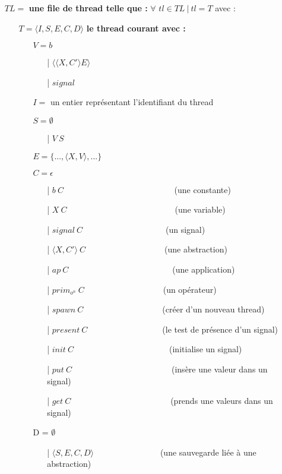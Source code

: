 \documentclass[10pt,a4paper]{report}
\begin{document}
\begin{itemize}
\item[] $TL =$ \textbf{une file de thread telle que :} $\forall$ $tl \in TL~|~tl = T$ avec :
  \begin{itemize}
  \item[] $T = \langle I,S,E,C,D\rangle$ \textbf{le thread courant avec :}
    \begin{itemize}
    \item[] $V = b$	
      \begin{itemize}
      \item[|] $\langle\langle X,C' \rangle E\rangle$
      \item[|] $signal$
      \end{itemize}
    \item[] $I =$ un entier représentant l'identifiant du thread
    \item[] $S =  \emptyset$ 
      \begin{itemize}
      \item[|] $V~S$
      \end{itemize}
    \item[] $E = \{...,\langle X,V\rangle,...\}$
    \item[] $C = \epsilon$
      \begin{itemize}
      \item[|] $b~C$~~~~~~~~~~~~~~~~~~~~~~~~~~    (une constante)
      \item[|] $X~C$~~~~~~~~~~~~~~~~~~~~~~~~~~(une variable)
      \item[|] $signal~C$~~~~~~~~~~~~~~~~~~~~(un signal)
      \item[|] $\langle X,C'\rangle~C$~~~~~~~~~~~~~~~~~~~(une abstraction)
      \item[|] $ap~C$~~~~~~~~~~~~~~~~~~~~~~~~~(une application)
      \item[|] $prim_{o^{n}}~C$~~~~~~~~~~~~~~~~~~~(un opérateur)
      \item[|] $spawn~C$~~~~~~~~~~~~~~~~~~~(créer d'un nouveau thread)
      \item[|] $present~C$~~~~~~~~~~~~~~~~~~(le test de présence d'un signal)
      \item[|] $init~C$~~~~~~~~~~~~~~~~~~~~~~~(initialise un signal)
      \item[|] $put~C$~~~~~~~~~~~~~~~~~~~~~~~~(insère une valeur dans un signal)
      \item[|] $get~C$~~~~~~~~~~~~~~~~~~~~~~~~(prends une valeurs dans un signal)
      \end{itemize}
    \item[] D = $\emptyset$
      \begin{itemize}
      \item[|] $\langle S,E,C,D\rangle$~~~~~~~~~~~~~~~~(une sauvegarde liée à une abstraction)
      \end{itemize}
    \end{itemize}	
  \end{itemize}
  

\end{itemize}
\end{document}
